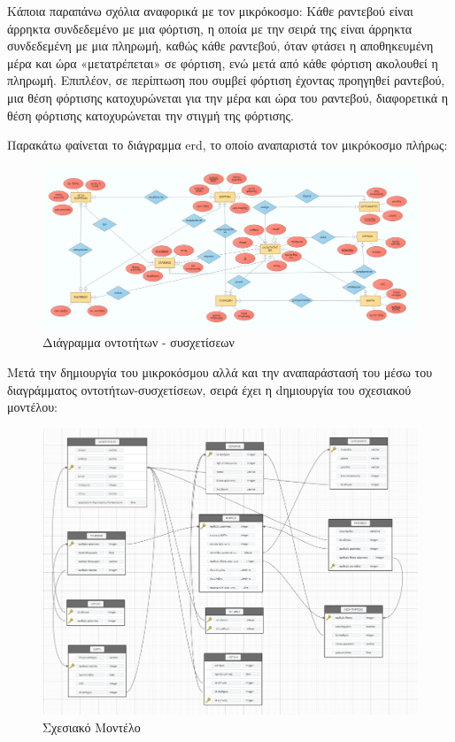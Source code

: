 \documentclass[manuscript,screen,review]{acmart}
\newcommand{\en}[1]{\foreignlanguage{english}{#1}}
\begin{document}
Κάποια παραπάνω σχόλια αναφορικά με τον μικρόκοσμο:
Κάθε ραντεβού είναι άρρηκτα συνδεδεμένο με μια φόρτιση, η οποία με την σειρά της είναι άρρηκτα
συνδεδεμένη με μια πληρωμή, καθώς κάθε ραντεβού, όταν φτάσει η αποθηκευμένη μέρα και ώρα 
«μετατρέπεται» σε φόρτιση, ενώ μετά από κάθε φόρτιση ακολουθεί η πληρωμή. Επιπλέον, σε περίπτωση 
που συμβεί φόρτιση έχοντας προηγηθεί ραντεβού, μια θέση φόρτισης κατοχυρώνεται για την μέρα και
ώρα του ραντεβού, διαφορετικά η θέση φόρτισης κατοχυρώνεται την στιγμή της φόρτισης.

\newpage
Παρακάτω φαίνεται το διάγραμμα \en{erd}, το οποίο αναπαριστά τον μικρόκοσμο πλήρως:

\begin{figure}[H]
    \centering
    \includegraphics[width=1.1\textwidth]{./Διάγραμμα οντοτήτων συσχετίσεων (τελικό)_3.png}
    \caption{Διάγραμμα οντοτήτων - συσχετίσεων}
\end{figure}
\newpage
Μετά την δημιουργία του μικροκόσμου αλλά και την αναπαράστασή του μέσω του διαγράμματος
οντοτήτων-συσχετίσεων, σειρά έχει η dημιουργία του σχεσιακού μοντέλου:

\begin{figure}[H]
    \centering
    \includegraphics[width=1.1\textwidth]{./schema_final.png}
    \caption{Σχεσιακό Μοντέλο}
\end{figure}
\end{document}
